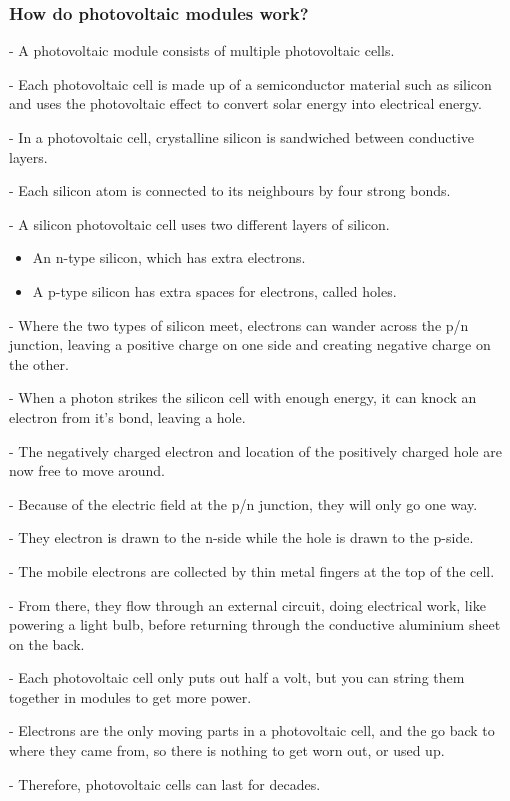 \subsubsection{How do photovoltaic modules work?}
\noindent - A photovoltaic module consists of multiple photovoltaic cells.\par
\noindent - Each photovoltaic cell is made up of a semiconductor material such as silicon and uses the photovoltaic effect to convert solar energy into electrical energy.\par
\noindent - In a photovoltaic cell, crystalline silicon is sandwiched between conductive layers.\par
\noindent - Each silicon atom is connected to its neighbours by four strong bonds.\par
\noindent - A silicon photovoltaic cell uses two different layers of silicon.\par
\begin{itemize}
    \item An n-type silicon, which has extra electrons.
    \item A p-type silicon has extra spaces for electrons, called holes.
\end{itemize}
\noindent - Where the two types of silicon meet, electrons can wander across the p/n junction, leaving a positive charge on one side and creating negative charge on the other.\par

\noindent - When a photon strikes the silicon cell with enough energy, it can knock an electron from it's bond, leaving a hole.\par
\noindent - The negatively charged electron and location of the positively charged hole are now free to move around.\par
\noindent - Because of the electric field at the p/n junction, they will only go one way.\par
\noindent - They electron is drawn to the n-side while the hole is drawn to the p-side.\par
\noindent - The mobile electrons are collected by thin metal fingers at the top of the cell.\par
\noindent - From there, they flow through an external circuit, doing electrical work, like powering a light bulb, before returning through the conductive aluminium sheet on the back.\par
\noindent - Each photovoltaic cell only puts out half a volt, but you can string them together in modules to get more power.\par
\noindent - Electrons are the only moving parts in a photovoltaic cell, and the go back to where they came from, so there is nothing to get worn out, or used up.\par
\noindent - Therefore, photovoltaic cells can last for decades.\vspace{0.5em}

